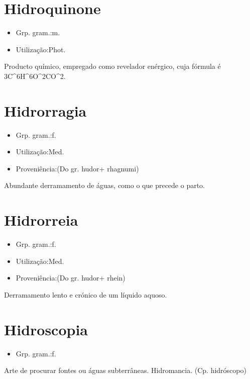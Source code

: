 \documentclass{article}
\begin{document}
\section{Hidroquinone}
\begin{itemize}
\item {Grp. gram.:m.}
\end{itemize}
\begin{itemize}
\item {Utilização:Phot.}
\end{itemize}
Producto químico, empregado como revelador enérgico, cuja fórmula é 3C^{6}H^{6}O^{2}CO^{2}.
\section{Hidrorragia}
\begin{itemize}
\item {Grp. gram.:f.}
\end{itemize}
\begin{itemize}
\item {Utilização:Med.}
\end{itemize}
\begin{itemize}
\item {Proveniência:(Do gr. \textunderscore hudor\textunderscore  + \textunderscore rhagnumi\textunderscore )}
\end{itemize}
Abundante derramamento de águas, como o que precede o parto.
\section{Hidrorreia}
\begin{itemize}
\item {Grp. gram.:f.}
\end{itemize}
\begin{itemize}
\item {Utilização:Med.}
\end{itemize}
\begin{itemize}
\item {Proveniência:(Do gr. \textunderscore hudor\textunderscore  + \textunderscore rhein\textunderscore )}
\end{itemize}
Derramamento lento e crónico de um líquido aquoso.
\section{Hidroscopia}
\begin{itemize}
\item {Grp. gram.:f.}
\end{itemize}
Arte de procurar fontes ou águas subterrâneas.
Hidromancia.
(Cp. \textunderscore hidróscopo\textunderscore )
\end{document}
